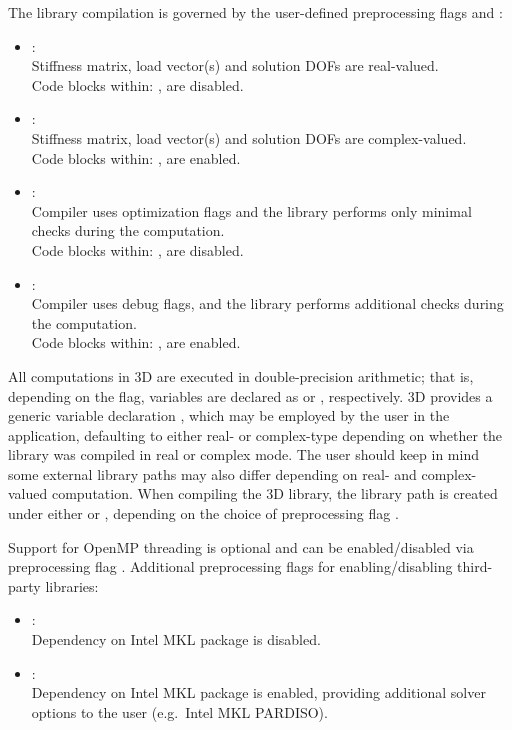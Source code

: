 The library compilation is governed by the user-defined preprocessing flags  and :
\begin{itemize}
	\itemsep 0pt
	\item{ :\\
	Stiffness matrix, load vector(s) and solution DOFs are real-valued.\\
	Code blocks within: , are disabled.
	} \item{ :\\
	Stiffness matrix, load vector(s) and solution DOFs are complex-valued.\\
	Code blocks within: , are enabled.
	} \item{ :\\
	Compiler uses optimization flags and the library performs only minimal checks during the computation.\\
	Code blocks within: , are disabled.
	} \item{ :\\
	Compiler uses debug flags, and the library performs additional checks during the computation.\\
	Code blocks within: , are enabled.
	}
\end{itemize}
All computations in \hp3D are executed in double-precision arithmetic; that is, depending on the  flag, variables are declared as  or , respectively. \hp3D provides a generic variable declaration , which may be employed by the user in the application, defaulting to either real- or complex-type depending on whether the library was compiled in real or complex mode. The user should keep in mind some external library paths may also differ depending on real- and complex-valued computation. When compiling the \hp3D library, the library path is created under either  or , depending on the choice of preprocessing flag .

Support for OpenMP threading is optional and can be enabled/disabled via preprocessing flag . Additional preprocessing flags for enabling/disabling third-party libraries:
\begin{itemize}
	\item{:\\
	Dependency on Intel MKL package is disabled.
	} \item{:\\
	Dependency on Intel MKL package is enabled, providing additional solver options to the user (e.g.~Intel MKL PARDISO).}
\end{itemize}

